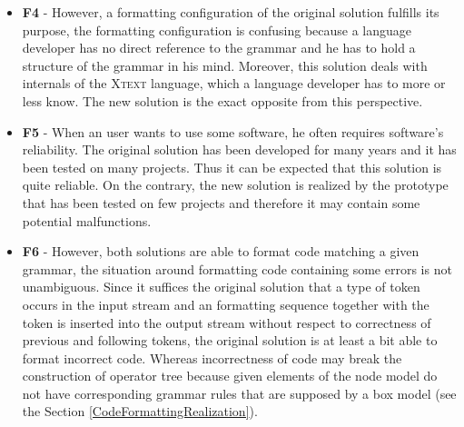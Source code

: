 \documentclass[12pt,notitlepage,a4paper]{report}
\begin{document}
\begin{itemize}
\begin{expl}\label{HeuristicRulesForEvaluation}
Some heuristic rules dedicated for generating an initial box model for the grammar from the \textit{Listing \ref{grammar}}.
\begingroup
\fontsize{10pt}{12pt}
\begin{Verbatim}[commandchars=\\\{\}]
operators "platform:/resource/gpp/settings/operators.ppo"

Terminals: 
    INT: <F c="#7F7F7F">
    ML_COMMENT: <F i=italic, c="#00FF00">,<MC>
    SL_COMMENT: <F i=italic, c="#00FF00">,<SC>
    Keyword["^\textbackslash\textbackslash{}w.*\$"]: <F w=bold,c="#7F0055">
    default: <F>

Non-terminals:
    root? : <V>
    ['package'|'import',1-*] : <H>
    [1-*,')','\{'] : <H>
    ['\{',*,'\}'] : <V>
    [*,'class',*] : <H>
    [',',1] : <H>
\end{Verbatim}
\endgroup
\end{expl}

\item \textbf{F4} - However, a formatting configuration of the original solution fulfills its purpose, the formatting configuration is confusing because a language developer has no direct reference to the grammar and he has to hold a structure of the grammar in his mind. Moreover, this solution deals with internals of the \textsc{Xtext} language, which a language developer has to more or less know. The new solution is the exact opposite from this perspective.
\item \textbf{F5} - When an user wants to use some software, he often requires software's reliability. The original solution has been developed for many years and it has been tested on many projects. Thus it can be expected that this solution is quite reliable. On the contrary, the new solution is realized by the prototype that has been tested on few projects and therefore it may contain some potential malfunctions.
\item \textbf{F6} - However, both solutions are able to format code matching a given grammar, the situation around formatting code containing some errors is not unambiguous. Since it suffices the original solution that a type of token occurs in the input stream and an formatting sequence together with the token is inserted into the output stream without respect to correctness of previous and following tokens, the original solution is  at least a bit able to format incorrect code. Whereas incorrectness of code may break the construction of operator tree because given elements of the node model do not have corresponding grammar rules that are supposed by a box model (see the Section \ref{CodeFormattingRealization}).

\end{itemize}
\end{document}

